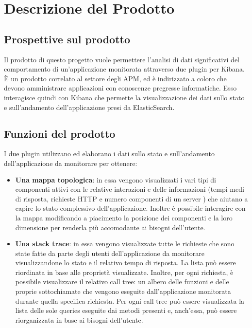 \section{Descrizione del Prodotto} \label{descrizione}
	\subsection{Prospettive sul prodotto}
	Il prodotto di questo progetto vuole permettere l'analisi di dati significativi del comportamento di un'applicazione monitorata attraverso due plugin per Kibana.
	È un prodotto correlato al settore degli APM, ed è indirizzato a coloro che devono amministrare applicazioni con conoscenze pregresse informatiche. Esso interagisce quindi con Kibana che permette la visualizzazione dei dati sullo stato e sull'andamento dell'applicazione presi da ElasticSearch.
	\subsection{Funzioni del prodotto}
	I due plugin utilizzano ed elaborano i dati sullo stato e sull'andamento dell'applicazione da monitorare per ottenere:
	\begin{itemize}
		\item 	\textbf{Una mappa topologica}: in essa vengono visualizzati i vari tipi di componenti attivi con le relative interazioni e delle informazioni (tempi medi di risposta, richieste HTTP e numero componenti di un server ) che aiutano a capire lo stato complessivo dell'applicazione. Inoltre è possibile interagire con la mappa modificando a piacimento la posizione dei componenti e la loro dimensione per renderla più accomodante ai bisogni dell'utente.
		\item \textbf{Una stack trace}: in essa vengono visualizzate tutte le richieste che sono state fatte da parte degli utenti dell'applicazione da monitorare visualizzandone lo stato e il relativo tempo di risposta. La lista può essere riordinata in base alle proprietà visualizzate.
		Inoltre, per ogni richiesta, è possibile visualizzare il relativo call tree: un albero delle funzioni e delle proprie sottochiamate che vengono eseguite dall'applicazione monitorata durante quella specifica richiesta. Per ogni call tree può essere visualizzata la lista delle sole queries eseguite dai metodi presenti e, anch'essa, può essere riorganizzata in base ai bisogni dell'utente.
	\end{itemize} 
